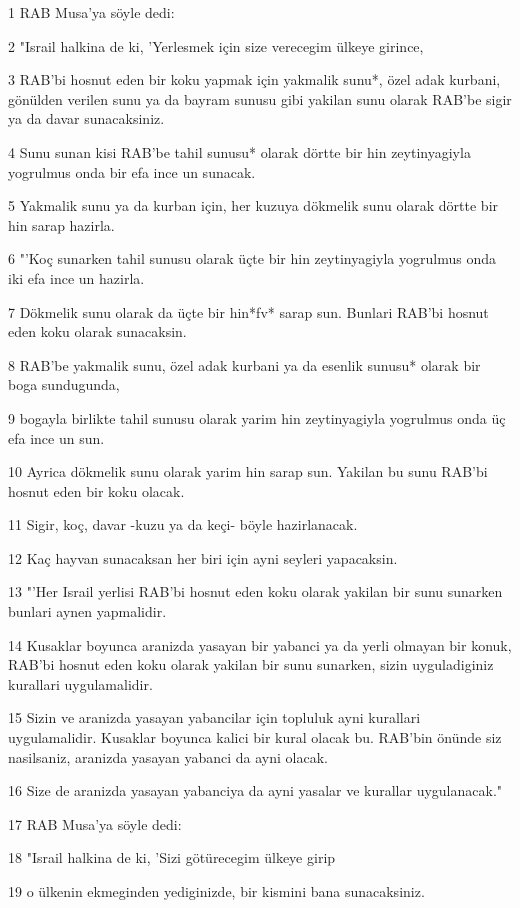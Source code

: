 \par 1 RAB Musa'ya söyle dedi:
\par 2 "Israil halkina de ki, 'Yerlesmek için size verecegim ülkeye girince,
\par 3 RAB'bi hosnut eden bir koku yapmak için yakmalik sunu*, özel adak kurbani, gönülden verilen sunu ya da bayram sunusu gibi yakilan sunu olarak RAB'be sigir ya da davar sunacaksiniz.
\par 4 Sunu sunan kisi RAB'be tahil sunusu* olarak dörtte bir hin zeytinyagiyla yogrulmus onda bir efa ince un sunacak.
\par 5 Yakmalik sunu ya da kurban için, her kuzuya dökmelik sunu olarak dörtte bir hin sarap hazirla.
\par 6 "'Koç sunarken tahil sunusu olarak üçte bir hin zeytinyagiyla yogrulmus onda iki efa ince un hazirla.
\par 7 Dökmelik sunu olarak da üçte bir hin*fv* sarap sun. Bunlari RAB'bi hosnut eden koku olarak sunacaksin.
\par 8 RAB'be yakmalik sunu, özel adak kurbani ya da esenlik sunusu* olarak bir boga sundugunda,
\par 9 bogayla birlikte tahil sunusu olarak yarim hin zeytinyagiyla yogrulmus onda üç efa ince un sun.
\par 10 Ayrica dökmelik sunu olarak yarim hin sarap sun. Yakilan bu sunu RAB'bi hosnut eden bir koku olacak.
\par 11 Sigir, koç, davar -kuzu ya da keçi- böyle hazirlanacak.
\par 12 Kaç hayvan sunacaksan her biri için ayni seyleri yapacaksin.
\par 13 "'Her Israil yerlisi RAB'bi hosnut eden koku olarak yakilan bir sunu sunarken bunlari aynen yapmalidir.
\par 14 Kusaklar boyunca aranizda yasayan bir yabanci ya da yerli olmayan bir konuk, RAB'bi hosnut eden koku olarak yakilan bir sunu sunarken, sizin uyguladiginiz kurallari uygulamalidir.
\par 15 Sizin ve aranizda yasayan yabancilar için topluluk ayni kurallari uygulamalidir. Kusaklar boyunca kalici bir kural olacak bu. RAB'bin önünde siz nasilsaniz, aranizda yasayan yabanci da ayni olacak.
\par 16 Size de aranizda yasayan yabanciya da ayni yasalar ve kurallar uygulanacak."
\par 17 RAB Musa'ya söyle dedi:
\par 18 "Israil halkina de ki, 'Sizi götürecegim ülkeye girip
\par 19 o ülkenin ekmeginden yediginizde, bir kismini bana sunacaksiniz.
